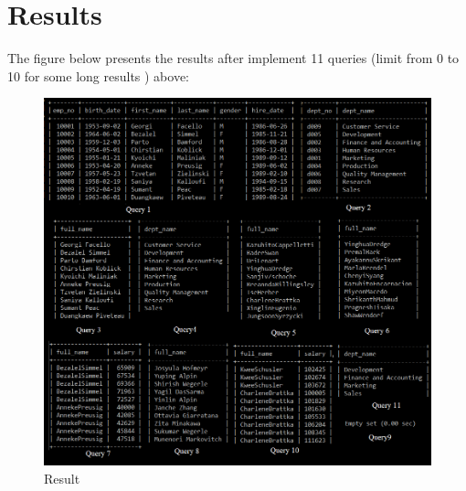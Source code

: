 \documentclass{article}
\begin{document}
\section*{Results}

The figure below presents the results after implement 11 queries (limit from 0 to 10 for some long results
) above:\\
\begin{figure}
\includegraphics[scale = 0.65]{result.PNG}
\caption{Result}
\end{figure}
\end{document}
